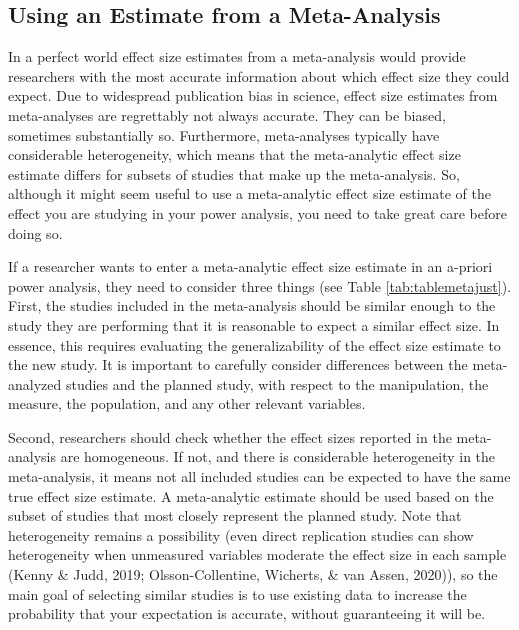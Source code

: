 \documentclass[
  english,
  ,jou, a4paper,floatsintext]{apa6}
\begin{document}
\hypertarget{using-an-estimate-from-a-meta-analysis}{%
\subsection{Using an Estimate from a Meta-Analysis}\label{using-an-estimate-from-a-meta-analysis}}

In a perfect world effect size estimates from a meta-analysis would provide researchers with the most accurate information about which effect size they could expect. Due to widespread publication bias in science, effect size estimates from meta-analyses are regrettably not always accurate. They can be biased, sometimes substantially so. Furthermore, meta-analyses typically have considerable heterogeneity, which means that the meta-analytic effect size estimate differs for subsets of studies that make up the meta-analysis. So, although it might seem useful to use a meta-analytic effect size estimate of the effect you are studying in your power analysis, you need to take great care before doing so.

If a researcher wants to enter a meta-analytic effect size estimate in an a-priori power analysis, they need to consider three things (see Table \ref{tab:tablemetajust}). First, the studies included in the meta-analysis should be similar enough to the study they are performing that it is reasonable to expect a similar effect size. In essence, this requires evaluating the generalizability of the effect size estimate to the new study. It is important to carefully consider differences between the meta-analyzed studies and the planned study, with respect to the manipulation, the measure, the population, and any other relevant variables.

Second, researchers should check whether the effect sizes reported in the meta-analysis are homogeneous. If not, and there is considerable heterogeneity in the meta-analysis, it means not all included studies can be expected to have the same true effect size estimate. A meta-analytic estimate should be used based on the subset of studies that most closely represent the planned study. Note that heterogeneity remains a possibility (even direct replication studies can show heterogeneity when unmeasured variables moderate the effect size in each sample (Kenny \& Judd, 2019; Olsson-Collentine, Wicherts, \& van Assen, 2020)), so the main goal of selecting similar studies is to use existing data to increase the probability that your expectation is accurate, without guaranteeing it will be.
\end{document}
